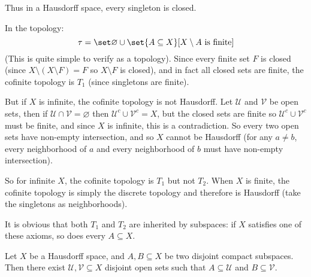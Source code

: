 \documentclass[10pt]{article}
\def\mU{\mathcal{U}}
\def\mV{\mathcal{V}}
\begin{document}
Thus in a Hausdorff space, every singleton is closed.

\begin{exam*}

    In the  topology:
    \[ \tau = \set\varnothing\cup\set{A\subseteq X}[X\setminus A\text{ is finite}] \]
    (This is quite simple to verify as a topology).
    Since every finite set $F$ is closed (since $X\setminus(X\setminus F)=F$ so $X\setminus F$ is closed), and in fact all closed sets are finite, the cofinite topology is $T_1$
    (since singletons are finite).

    But if $X$ is infinite, the cofinite topology is not Hausdorff.
    Let $\mU$ and $\mV$ be open sets, then if $\mU\cap\mV=\varnothing$ then $\mU^c\cup\mV^c=X$, but the closed sets are finite so $\mU^c\cup\mV^c$ must be finite, and since $X$ is infinite, this is a
    contradiction.
    So every two open sets have non-empty intersection, and so $X$ cannot be Hausdorff (for any $a\neq b$, every neighborhood of $a$ and every neighborhood of $b$ must have non-empty intersection).

    So for infinite $X$, the cofinite topology is $T_1$ but not $T_2$.
    When $X$ is finite, the cofinite topology is simply the discrete topology and therefore is Hausdorff (take the singletons as neighborhoods).

\end{exam*}

It is obvious that both $T_1$ and $T_2$ are inherited by subspaces: if $X$ satisfies one of these axioms, so does every $A\subseteq X$.

\begin{prop*}

    Let $X$ be a Hausdorff space, and $A,B\subseteq X$ be two disjoint compact subspaces.
    Then there exist $\mU,\mV\subseteq X$ disjoint open sets such that $A\subseteq\mU$ and $B\subseteq\mV$.

\end{prop*}
\end{document}
